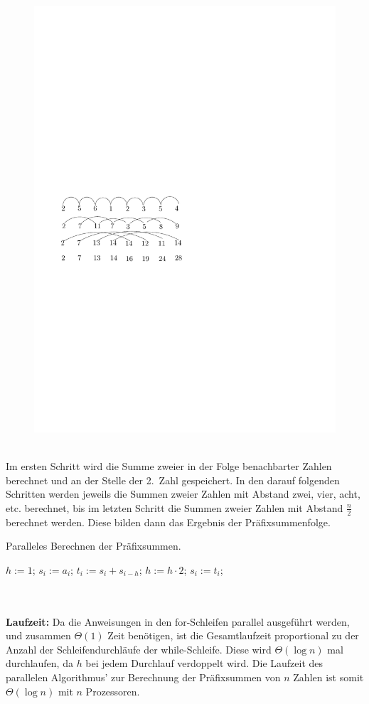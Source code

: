 \begin{figure}[h!]
\includegraphics[scale=0.8]{bilder/PraefixsummeSchema.pdf}
\end{figure}
\\
Im ersten Schritt wird die Summe zweier in der Folge benachbarter Zahlen berechnet und an der Stelle der 2.~Zahl gespeichert. In den darauf folgenden Schritten werden jeweils die Summen zweier Zahlen mit Abstand zwei, vier, acht, etc. berechnet, bis im letzten Schritt die Summen zweier Zahlen mit Abstand $\frac{n}{2}$ berechnet werden. Diese bilden dann das Ergebnis der Präfixsummenfolge.
\begin{algorithm}[h!]
\caption{Paralleles Berechnen der Präfixsummen.}
\begin{algorithmic}
\STATE $h:=1$;
\STATE $s_i:=a_i$;
\ENDFOR
{}
\STATE $t_i:=s_i+s_{i-h}$;
\ENDFOR
\STATE $h:=h\cdot 2$;
\STATE $s_i:=t_i$;
\ENDFOR
\ENDWHILE
\end{algorithmic}
\end{algorithm}
\\
\\
{\bf{Laufzeit:}} Da die Anweisungen in den for-Schleifen parallel ausgeführt werden, und zusammen $\Theta(1)$ Zeit benötigen, ist die Gesamtlaufzeit proportional zu der Anzahl der Schleifendurchläufe der while-Schleife. Diese wird $\Theta(\log n)$ mal durchlaufen, da $h$  bei jedem Durchlauf verdoppelt wird. Die Laufzeit des parallelen Algorithmus' zur Berechnung der Präfixsummen von $n$ Zahlen ist somit $\Theta(\log n)$ mit $n$ Prozessoren.
